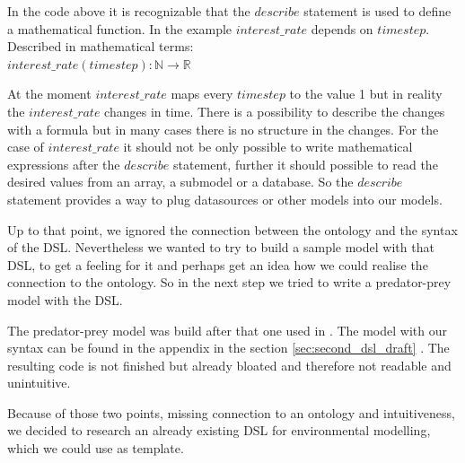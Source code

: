 \par
In the code above it is recognizable that the $describe$ statement is used to define a mathematical function. In the example $interest\_rate$ depends on $timestep$. Described in mathematical terms:\\
$interest\_rate(timestep) : \mathbb{N} \rightarrow  \mathbb{R}$
\par
At the moment $interest\_rate$ maps every $timestep$ to the value 1 but in reality the $interest\_rate$ changes in time. There is a possibility to describe the changes with a formula but in many cases there is no structure in the changes. For the case of $interest\_rate$ it should not be only possible to write mathematical expressions after the $describe$ statement, further it should possible to read the desired values from an array, a submodel or a database. So the $describe$ statement provides a way to plug datasources or other models into our models.
\par
Up to that point, we ignored the connection between the ontology and the syntax of the DSL. Nevertheless we wanted to try to build a sample model with that DSL, to get a feeling for it and perhaps get an idea how we could realise the connection to the ontology. So in the next step we tried to write a predator-prey model with the DSL.
\par
The predator-prey model was build after that one used in \autocite{dsl:dynamo}. The model with our syntax can be found in the appendix in the section \ref{sec:second_dsl_draft} .
The resulting code is not finished but already bloated and therefore not readable and unintuitive.
\par
Because of those two points, missing connection to an ontology and intuitiveness, we decided to research an already existing DSL for environmental modelling, which we could use as template.


